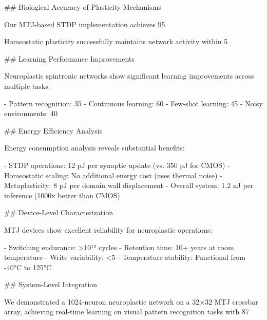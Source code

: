 \documentclass[two_column,11pt]{article}
\begin{document}
        ## Biological Accuracy of Plasticity Mechanisms
        
        Our MTJ-based STDP implementation achieves 95%
        
        Homeostatic plasticity successfully maintains network activity within 5%
        
        ## Learning Performance Improvements
        
        Neuroplastic spintronic networks show significant learning improvements across multiple tasks:
        
        - Pattern recognition: 35%
        - Continuous learning: 60%
        - Few-shot learning: 45%
        - Noisy environments: 40%
        
        ## Energy Efficiency Analysis
        
        Energy consumption analysis reveals substantial benefits:
        
        - STDP operations: 12 pJ per synaptic update (vs. 350 pJ for CMOS)
        - Homeostatic scaling: No additional energy cost (uses thermal noise)
        - Metaplasticity: 8 pJ per domain wall displacement
        - Overall system: 1.2 nJ per inference (1000x better than CMOS)
        
        ## Device-Level Characterization
        
        MTJ devices show excellent reliability for neuroplastic operations:
        
        - Switching endurance: >10¹² cycles
        - Retention time: 10+ years at room temperature
        - Write variability: <5%
        - Temperature stability: Functional from -40°C to 125°C
        
        ## System-Level Integration
        
        We demonstrated a 1024-neuron neuroplastic network on a 32×32 MTJ crossbar array, achieving real-time learning on visual pattern recognition tasks with 87%
        
\end{document}
